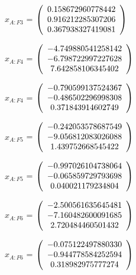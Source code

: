 \begin{description}
$\hat{x}_{A:F3}$  = $\left( \begin{array} {ccc} 0.158672960778442 \\ 0.916212285307206 \\ 0.367938327419081
\end{array} \right)\\ \\$

$x_{A:F4}$  = $\left( \begin{array} {ccc} -4.749880541258142 \\ -6.798722997227628 \\ 7.642858106345402
\end{array} \right)\\ \\$

$\hat{x}_{A:F4}$  = $\left( \begin{array} {ccc} -0.790599137524367 \\ -0.486502296998308 \\ 0.371843914602749
\end{array} \right)\\ \\$

$x_{A:F5}$  = $\left( \begin{array} {ccc} -0.242053578687549 \\ -9.056812083026088 \\ 1.439752668545422
\end{array} \right)\\ \\$

$\hat{x}_{A:F5}$  = $\left( \begin{array} {ccc} -0.997026104738064 \\ -0.065859729793698 \\ 0.040021179234804
\end{array} \right)\\ \\$

$x_{A:F6}$  = $\left( \begin{array} {ccc} -2.500561635645481 \\ -7.160482600091685 \\ 2.720484460501432
\end{array} \right)\\ \\$

$\hat{x}_{A:F6}$  = $\left( \begin{array} {ccc} -0.075122497880330 \\ -0.944778584252594 \\ 0.318982975777274
\end{array} \right)\\ \\$


\end{description}

